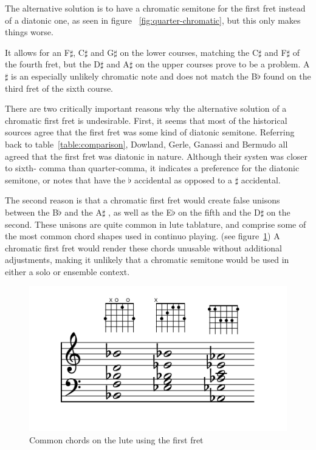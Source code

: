 The alternative solution is to have a chromatic semitone for the first fret instead of a
diatonic one, as seen in figure ~\ref{fig:quarter-chromatic}, but this only makes things
worse.

It allows for an F$\sharp$, C$\sharp$ and G$\sharp$ on the lower courses, matching the
C$\sharp$ and F$\sharp$ of the fourth fret, but the D$\sharp$ and A$\sharp$ on the
upper courses prove to be a problem. A$\sharp$ is an especially unlikely chromatic
note and does not match the B$\flat$ found on the third fret of the sixth course.

There are two critically important reasons why the alternative solution of a chromatic first fret is
undesirable. First, it seems that most of the historical sources agree that the first fret was some
kind of diatonic semitone.  Referring back to table~\ref{table:comparison}, Dowland, Gerle, Ganassi
and Bermudo all agreed that the first fret was diatonic in nature. Although their systen was closer
to sixth- comma than quarter-comma, it indicates a preference for the diatonic semitone, or notes
that have the $\flat$ accidental as opposed to a $\sharp$ accidental.

The second reason is that a chromatic first fret would create false unisons between the B$\flat$ and
the A$\sharp$ , as well as the E$\flat$ on the fifth and the D$\sharp$ on the second. These unisons
are quite common in lute tablature, and comprise some of the most common chord shapes used in
continuo playing. (see figure~\ref{first-fret-lute-chords}) A chromatic first fret would render
these  chords unusable without additional adjustments, making it unlikely that a chromatic semitone
would be used in either a solo or ensemble context.

\begin{figure}[h]
\centering
\includegraphics{examples/first-fret-lute-chords.pdf}
\caption{Common chords on the lute using the first fret}
\label{first-fret-lute-chords}
\end{figure}

